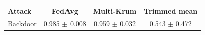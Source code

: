 \begin{tabular}{lccc}
\toprule
Attack & FedAvg & Multi-Krum & Trimmed mean \\
\midrule
Backdoor & 0.985 $\pm$ 0.008 & 0.959 $\pm$ 0.032 & 0.543 $\pm$ 0.472 \\
\bottomrule
\end{tabular}

